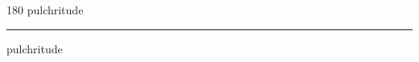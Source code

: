 
\begin{frame}
\begin{center}
\begin{turn}{180}
{\fontsize{2.5cm}{1em}\selectfont pulchritude}
\end{turn}
\vspace{1em}\par  
\hrule
\vspace{1em}\par  
{\fontsize{2.5cm}{1em}\selectfont pulchritude}
\end{center}
\end{frame}
